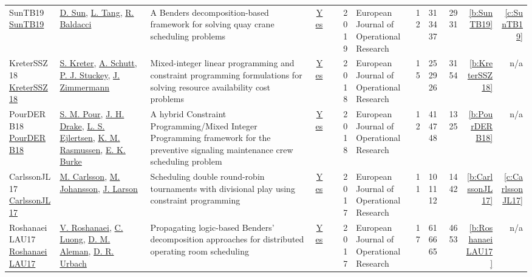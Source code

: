 {\begin{longtable}{>{\raggedright\arraybackslash}p{3cm}>{\raggedright\arraybackslash}p{4.5cm}>{\raggedright\arraybackslash}p{6.0cm}rrrp{2.5cm}rp{1cm}p{1cm}rr}
SunTB19 \href{http://dx.doi.org/10.1016/j.ejor.2018.08.009}{SunTB19} & \hyperref[auth:a1196]{D. Sun}, \hyperref[auth:a1197]{L. Tang}, \hyperref[auth:a1198]{R. Baldacci} & \cellcolor{green!10}A Benders decomposition-based framework for solving quay crane scheduling problems & \href{../works/SunTB19.pdf}{Yes} & \cite{SunTB19} & 2019 & European Journal of Operational Research & 12 & 31 34 37 & 29 31 & \ref{b:SunTB19} & \ref{c:SunTB19}\\
KreterSSZ18 \href{https://doi.org/10.1016/j.ejor.2017.10.014}{KreterSSZ18} & \hyperref[auth:a123]{S. Kreter}, \hyperref[auth:a124]{A. Schutt}, \hyperref[auth:a125]{P. J. Stuckey}, \hyperref[auth:a792]{J. Zimmermann} & Mixed-integer linear programming and constraint programming formulations for solving resource availability cost problems & \href{../works/KreterSSZ18.pdf}{Yes} & \cite{KreterSSZ18} & 2018 & European Journal of Operational Research & 15 & 25 29 26 & 31 54 & \ref{b:KreterSSZ18} & n/a\\
PourDERB18 \href{https://doi.org/10.1016/j.ejor.2017.08.033}{PourDERB18} & \hyperref[auth:a564]{S. M. Pour}, \hyperref[auth:a565]{J. H. Drake}, \hyperref[auth:a566]{L. S. Ejlertsen}, \hyperref[auth:a567]{K. M. Rasmussen}, \hyperref[auth:a568]{E. K. Burke} & \cellcolor{gold!20}A hybrid Constraint Programming/Mixed Integer Programming framework for the preventive signaling maintenance crew scheduling problem & \href{../works/PourDERB18.pdf}{Yes} & \cite{PourDERB18} & 2018 & European Journal of Operational Research & 12 & 41 47 48 & 13 25 & \ref{b:PourDERB18} & n/a\\
CarlssonJL17 \href{https://doi.org/10.1016/j.ejor.2016.11.033}{CarlssonJL17} & \hyperref[auth:a91]{M. Carlsson}, \hyperref[auth:a75]{M. Johansson}, \hyperref[auth:a1413]{J. Larson} & \cellcolor{gold!20}Scheduling double round-robin tournaments with divisional play using constraint programming & \href{../works/CarlssonJL17.pdf}{Yes} & \cite{CarlssonJL17} & 2017 & European Journal of Operational Research & 11 & 10 11 12 & 14 42 & \ref{b:CarlssonJL17} & \ref{c:CarlssonJL17}\\
RoshanaeiLAU17 \href{http://dx.doi.org/10.1016/j.ejor.2016.08.024}{RoshanaeiLAU17} & \hyperref[auth:a728]{V. Roshanaei}, \hyperref[auth:a927]{C. Luong}, \hyperref[auth:a895]{D. M. Aleman}, \hyperref[auth:a896]{D. R. Urbach} & Propagating logic-based Benders' decomposition approaches for distributed operating room scheduling & \href{../works/RoshanaeiLAU17.pdf}{Yes} & \cite{RoshanaeiLAU17} & 2017 & European Journal of Operational Research & 17 & 61 66 65 & 46 53 & \ref{b:RoshanaeiLAU17} & n/a\\

\end{longtable}}
